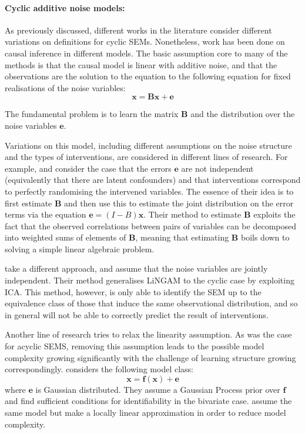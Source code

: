\paragraph{Cyclic additive noise models:}
As previously discussed, different works in the literature consider different variations on definitions for cyclic SEMs. 
Nonetheless, work has been done on causal inference in different models. 
The basic assumption core to many of the methods is that the causal model is linear with additive noise, and that the observations are the solution to the equation to the following equation for fixed realisations of the noise variables:
\[ \mathbf{x} = \mathbf{B}\mathbf{x} + \mathbf{e}\]

The fundamental problem is to learn the matrix $\mathbf{B}$ and the distribution over the noise variables $\mathbf{e}$.


Variations on this model, including different assumptions on the noise structure and the types of interventions, are considered in different lines of research. 
For example, \cite{hyttinen2010causal} \cite{hyttinen2012learning} \cite{hyttinen2013discovering} and \cite{scheines2010combining} consider the case that the errors $\mathbf{e}$ are not independent (equivalently that there are latent confounders) and that interventions correspond to perfectly randomising the intervened variables. 
The essence of their idea is to first estimate $\mathbf{B}$ and then use this to estimate the joint distribution on the error terms via the equation $\mathbf{e} = (I-B)\mathbf{x}$. 
Their method to estimate $\mathbf{B}$ exploits the fact that the observed correlations between pairs of variables can be decomposed into weighted sums of elements of $\mathbf{B}$, meaning that estimating $\mathbf{B}$ boils down to solving a simple linear algebraic problem.


\cite{lacerda2012discovering} take a different approach, and assume that the noise variables are jointly independent. 
Their method generalises LiNGAM \cite{shimizu2006linear} to the cyclic case by exploiting ICA. 
This method, however, is only able to identify the SEM up to the equivalence class of those that induce the same observational distribution, and so in general will not be able to correctly predict the result of interventions.

Another line of research tries to relax the linearity assumption. 
As was the case for acyclic SEMS, removing this assumption leads to the possible model complexity growing significantly with the challenge of learning structure growing correspondingly. \cite{mooij2011causal} considers the following model class:
\[\mathbf{x} = \mathbf{f}(\mathbf{x}) + \mathbf{e}\] 
where $\mathbf{e}$ is Gaussian distributed. 
They assume a Gaussian Process prior over $\mathbf{f}$ and find sufficient conditions for identifiability in the bivariate case. \cite{mooij2013cyclic} assume the same model but make a locally linear approximation in order to reduce model complexity.


